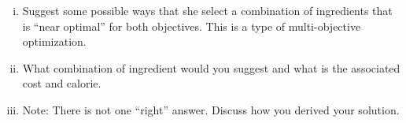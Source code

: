 \documentclass[../main.tex]{subfiles}
\begin{document}
\begin{enumerate}[i.]
	\item Suggest some possible ways that she select a combination of ingredients that is “near optimal” for both objectives. This is a type of multi-objective optimization.

	\item What combination of ingredient would you suggest and what is the associated cost and calorie.

	\item Note: There is not one “right” answer. Discuss how you derived your solution.
\end{enumerate}
\end{document}
